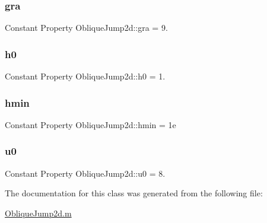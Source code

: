 \subsubsection{\texorpdfstring{gra}{gra}}
{\footnotesize\ttfamily Constant Property Oblique\+Jump2d\+::gra = 9.}

\mbox{\label{class_oblique_jump2d_a94970c0f0914cac0c3b5e122ea8d51fd}} 
\subsubsection{\texorpdfstring{h0}{h0}}
{\footnotesize\ttfamily Constant Property Oblique\+Jump2d\+::h0 = 1.}

\mbox{\label{class_oblique_jump2d_ad4c6aa8e8c16f8a85ee6db316e25b784}} 
\subsubsection{\texorpdfstring{hmin}{hmin}}
{\footnotesize\ttfamily Constant Property Oblique\+Jump2d\+::hmin = 1e}

\mbox{\label{class_oblique_jump2d_a857cc00f3cc311dcc4b8ba93ab17ae99}} 
\subsubsection{\texorpdfstring{u0}{u0}}
{\footnotesize\ttfamily Constant Property Oblique\+Jump2d\+::u0 = 8.}



The documentation for this class was generated from the following file\+:\begin{DoxyCompactItemize}
\item 
\hyperlink{_oblique_jump2d_8m}{Oblique\+Jump2d.\+m}\end{DoxyCompactItemize}
